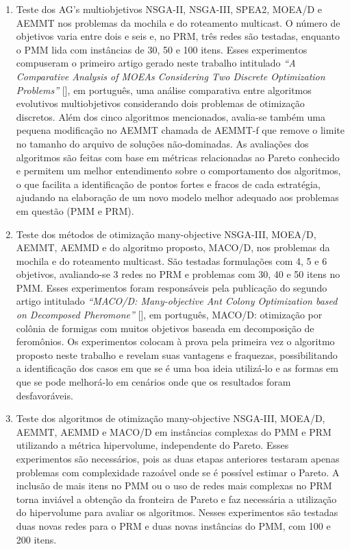 \begin{enumerate}
	\item Teste dos AG's multiobjetivos NSGA-II, NSGA-III, SPEA2, MOEA/D e AEMMT nos problemas da mochila e do roteamento multicast. O número de objetivos varia entre dois e seis e, no PRM, três redes são testadas, enquanto o PMM lida com instâncias de 30, 50 e 100 itens. Esses experimentos compuseram o primeiro artigo gerado neste trabalho intitulado \textit{``A Comparative Analysis of MOEAs Considering Two Discrete Optimization Problems''} [], em português, uma análise comparativa entre algoritmos evolutivos multiobjetivos considerando dois problemas de otimização discretos. Além dos cinco algoritmos mencionados, avalia-se também uma pequena modificação no AEMMT chamada de AEMMT-f que remove o limite no tamanho do arquivo de soluções não-dominadas. As avaliações dos algoritmos são feitas com base em métricas relacionadas ao Pareto conhecido e permitem um melhor entendimento sobre o comportamento dos algoritmos, o que facilita a identificação de pontos fortes e fracos de cada estratégia, ajudando na elaboração de um novo modelo melhor adequado aos problemas em questão (PMM e PRM).
	\item Teste dos métodos de otimização many-objective NSGA-III, MOEA/D, AEMMT, AEMMD e do algoritmo proposto, MACO/D, nos problemas da mochila e do roteamento multicast. São testadas formulações com 4, 5 e 6 objetivos, avaliando-se 3 redes no PRM e problemas com 30, 40 e 50 itens no PMM. Esses experimentos foram responsáveis pela publicação do segundo artigo intitulado \textit{``MACO/D: Many-objective Ant Colony Optimization based on Decomposed Pheromone''} [], em português, MACO/D: otimização por colônia de formigas com muitos objetivos baseada em decomposição de feromônios. Os experimentos colocam à prova pela primeira vez o algoritmo proposto neste trabalho e revelam suas vantagens e fraquezas, possibilitando a identificação dos casos em que se é uma boa ideia utilizá-lo e as formas em que se pode melhorá-lo em cenários onde que os resultados foram desfavoráveis.
	\item Teste dos algoritmos de otimização many-objective NSGA-III, MOEA/D, AEMMT, AEMMD e MACO/D em instâncias complexas do PMM e PRM utilizando a métrica hipervolume, independente do Pareto. Esses experimentos são necessários, pois as duas etapas anteriores testaram apenas problemas com complexidade razoável onde se é possível estimar o Pareto. A inclusão de mais itens no PMM ou o uso de redes mais complexas no PRM torna inviável a obtenção da fronteira de Pareto e faz necessária a utilização do hipervolume para avaliar os algoritmos. Nesses experimentos são testadas duas novas redes para o PRM e duas novas instâncias do PMM, com 100 e 200 itens.
\end{enumerate}

